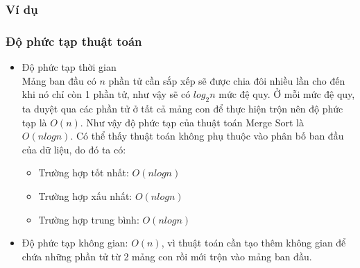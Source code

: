 \subsubsection{Ví dụ}

\subsubsection{Độ phức tạp thuật toán}

\begin{itemize}
    \item Độ phức tạp thời gian \\
    Mảng ban đầu có $n$ phần tử cần sắp xếp sẽ được chia đôi nhiều lần cho đến khi nó chỉ còn 1 phần tử, như vậy sẽ có $log_2{n}$ mức đệ quy. Ở mỗi mức đệ quy, ta duyệt qua các phần tử ở tất cả mảng con để thực hiện trộn nên độ phức tạp là $O(n)$. Như vậy độ phức tạp của thuật toán Merge Sort là $O(nlogn)$. Có thể thấy thuật toán không phụ thuộc vào phân bố ban đầu của dữ liệu, do đó ta có:
    \begin{itemize}[label=$\circ$]
        \item Trường hợp tốt nhất: $O(nlogn)$
        \item Trường hợp xấu nhất: $O(nlogn)$
        \item Trường hợp trung bình: $O(nlogn)$ 
    \end{itemize}
    
    \item Độ phức tạp không gian: $O(n)$, vì thuật toán cần tạo thêm không gian để chứa những phần tử từ 2 mảng con rồi mới trộn vào mảng ban đầu.
\end{itemize}